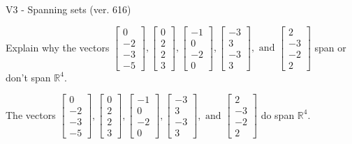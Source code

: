 \begin{exercise}
  \begin{exerciseTitle}V3 - Spanning sets (ver. 616)\end{exerciseTitle}
  \begin{exerciseStatement}
    Explain why the vectors \(\left[\begin{array}{r}
0 \\
-2 \\
-3 \\
-5
\end{array}\right] , \left[\begin{array}{r}
0 \\
2 \\
2 \\
3
\end{array}\right] , \left[\begin{array}{r}
-1 \\
0 \\
-2 \\
0
\end{array}\right] , \left[\begin{array}{r}
-3 \\
3 \\
-3 \\
3
\end{array}\right] , \text{ and } \left[\begin{array}{r}
2 \\
-3 \\
-2 \\
2
\end{array}\right]\) span or don't span \(\mathbb{R}^4\). 
	


  \end{exerciseStatement}
  \begin{exerciseAnswer}
   The vectors \(\left[\begin{array}{r}
0 \\
-2 \\
-3 \\
-5
\end{array}\right] , \left[\begin{array}{r}
0 \\
2 \\
2 \\
3
\end{array}\right] , \left[\begin{array}{r}
-1 \\
0 \\
-2 \\
0
\end{array}\right] , \left[\begin{array}{r}
-3 \\
3 \\
-3 \\
3
\end{array}\right] , \text{ and } \left[\begin{array}{r}
2 \\
-3 \\
-2 \\
2
\end{array}\right]\) 
  	 do  
	span \(\mathbb{R}^4\).
  



\end{exerciseAnswer}
\end{exercise}
